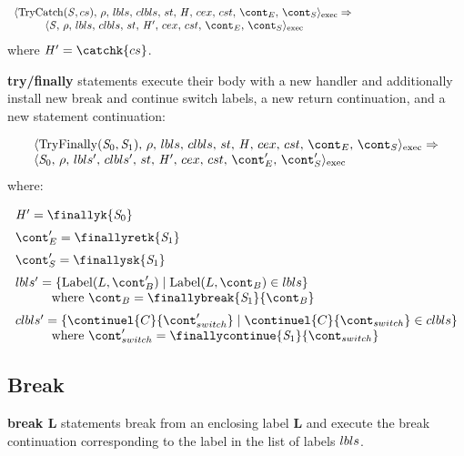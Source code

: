 \documentclass{article}
\begin{document}
\[
  \begin{array}{lcl}
	\execconf{\mathrm{TryCatch}(\stmt, cs)}{\env}{\lbls}{\clbls}{\handler}{\cex}{\cstrace}{\econt}{\scont}
	\Rightarrow\\
	\hspace{10mm}\execconf{\stmt}{\env}{\lbls}{\clbls}{\handler'}{\cex}{\cstrace}{\econt}
	{\scont}\hspace{50mm}
  \end{array}
\]
where $\handler' = \catchk{cs}$.


\noindent
\textbf{try/finally} statements execute their body with a new handler and additionally install new break and continue switch labels, a new return continuation, and a new statement continuation:

\[
  \begin{array}{lcl}
	\execconf{\mathrm{TryFinally}(\stmti{0}, \stmti{1})}{\env}{\lbls}{\clbls}{\handler}{\cex}{\cstrace}{\econt}{\scont}
	\Rightarrow\\
	\execconf{\stmti{0}}{\env}{\lbls'}{\clbls'}{\handler'}{\cex}{\cstrace}{\econt'}{\scont'}
	  \end{array}
\]
where:

\[
  \begin{array}{lcl}
	\handler' = \finallyk{\stmti{0}}\hspace{50mm}\\[2mm]

	\econt' = \finallyretk{\stmti{1}}\\[2mm]

	\scont' = \finallysk{\stmti{1}}\\[2mm]

	\lbls' = \lbrace \mathrm{Label}(L, \bcont') \mid \mathrm{Label}(L, \bcont) \in \lbls\rbrace \\
	\hspace{10mm}\textrm{where } \bcont = \finallybreak{\stmti{1}}{\bcont}\\[2mm]
	\clbls' =  \lbrace \continuel{C}{\switchcont'} \mid  \continuel{C}{\switchcont} \in \clbls\rbrace\\
	\hspace{10mm}\textrm{where } \switchcont' = \finallycontinue{\stmti{1}}{\switchcont}

  \end{array}
\]
\subsection{Break}
\textbf{break L} statements break from an enclosing label \textbf{L} and execute the break continuation corresponding to the label in the list of labels $lbls$.
\end{document}

